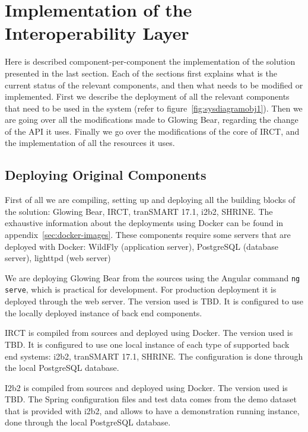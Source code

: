 \newpage
\section{Implementation of the Interoperability Layer}
Here is described component-per-component the implementation of the solution presented in the last section. 
Each of the sections first explains what is the current status of the relevant components, and then what needs to be modified or implemented.
First we describe the deployment of all the relevant components that need to be used in the system (refer to figure~\ref{fig:sysdiagramobj1}).
Then we are going over all the modifications made to Glowing Bear, regarding the change of the API it uses.
Finally we go over the modifications of the core of IRCT, and the implementation of all the resources it uses.


\subsection{Deploying Original Components}

First of all we are compiling, setting up and deploying all the building blocks of the solution: Glowing Bear, IRCT, tranSMART 17.1, i2b2, SHRINE.
The exhaustive information about the deployments using Docker can be found in appendix~\ref{sec:docker-images}.
These components require some servers that are deployed with Docker: WildFly (application server), PostgreSQL (database server), lighttpd (web server)

We are deploying Glowing Bear from the sources using the Angular command \verb|ng serve|, which is practical for development.
For production deployment it is deployed through the web server.
The version used is TBD.
It is configured to use the locally deployed instance of back end components.

IRCT is compiled from sources and deployed using Docker.
The version used is TBD.
It is configured to use one local instance of each type of supported back end systems: i2b2, tranSMART 17.1, SHRINE.
The configuration is done through the local PostgreSQL database.

I2b2 is compiled from sources and deployed using Docker.
The version used is TBD.
The Spring configuration files and test data comes from the demo dataset that is provided with i2b2, and allows to have a demonstration running instance, done through the local PostgreSQL database.

